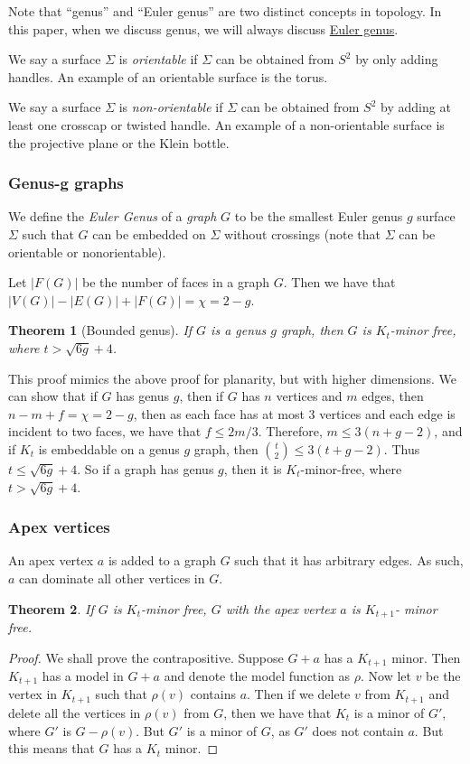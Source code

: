 \documentclass[]{report}
\newtheorem{theorem}{Theorem}
\theoremstyle{definition}
\numberwithin{theorem}{section}
\numberwithin{equation}{section}
\begin{document}
Note that ``genus'' and ``Euler genus'' are two distinct concepts in topology. In this paper, when we discuss genus, we will always discuss \underline{Euler genus}.

We say a surface $\Sigma$ is \textit{orientable} if $\Sigma$ can be obtained from $S^2$ by only adding handles. An example of an orientable surface is the torus.

We say a surface $\Sigma$ is \textit{non-orientable} if $\Sigma$ can be obtained from $S^2$ by adding at least one crosscap or twisted handle. An example of a non-orientable surface is the projective plane or the Klein bottle. 

\subsubsection{Genus-g graphs}\label{sssec:Graph_genus}

We define the \textit{Euler Genus} of a \textit{graph} $G$ to be the smallest Euler genus $g$ surface $\Sigma$ such that $G$ can be embedded on $\Sigma$ without crossings (note that $\Sigma$ can be orientable or nonorientable).

Let $|F(G)|$ be the number of faces in a graph $G$. Then we have that $|V(G)| - |E(G)| + |F(G)| = \chi = 2 - g$. 

\begin{theorem}[Bounded genus]\label{thm:bounded_genus_kt_free}
	If $G$ is a genus $g$ graph, then $G$ is $K_t$-minor free, where $t > \sqrt{6g} + 4$. 
\end{theorem}
This proof mimics the above proof for planarity, but with higher dimensions. 
We can show that if $G$ has genus $g$, then if $G$ has $n$ vertices and $m$ edges, then $n - m + f = \chi = 2-g$, then as each face has at most 3 vertices and each edge is incident to two faces, we have that $f \leq 2m/3$. Therefore, $m \leq 3(n + g - 2)$, and if $K_t$ is embeddable on a genus $g$ graph, then $\binom{t}{2} \leq 3 (t + g - 2)$. Thus $t \leq \sqrt{6g} + 4$. So if a graph has genus $g$, then it is $K_t$-minor-free, where $t > \sqrt{6g} + 4$. 

\subsubsection{Apex vertices}\label{sssec:Apex_Vertices}
An apex vertex $a$ is added to a graph $G$ such that it has arbitrary edges. As such, $a$ can dominate all other vertices in $G$.
\begin{theorem}
	If $G$ is $K_t$-minor free, $G$ with the apex vertex $a$ is $K_{t+1}$- minor free. 
\end{theorem}
\begin{proof}
	We shall prove the contrapositive. Suppose $G + a$ has a $K_{t + 1}$ minor. Then $K_{t + 1}$ has a model in $G + a$ and denote the model function as $\rho$. Now let $v$ be the vertex in $K_{t + 1}$ such that $\rho(v)$ contains $a$. Then if we delete $v$ from $K_{t + 1}$ and delete all the vertices in $\rho(v)$ from $G$, then we have that $K_t$ is a minor of $G'$, where $G'$ is $G - \rho(v)$. But $G'$ is a minor of $G$, as $G'$ does not contain $a$. But this means that $G$ has a $K_t$ minor. 
\end{proof}
\end{document}
